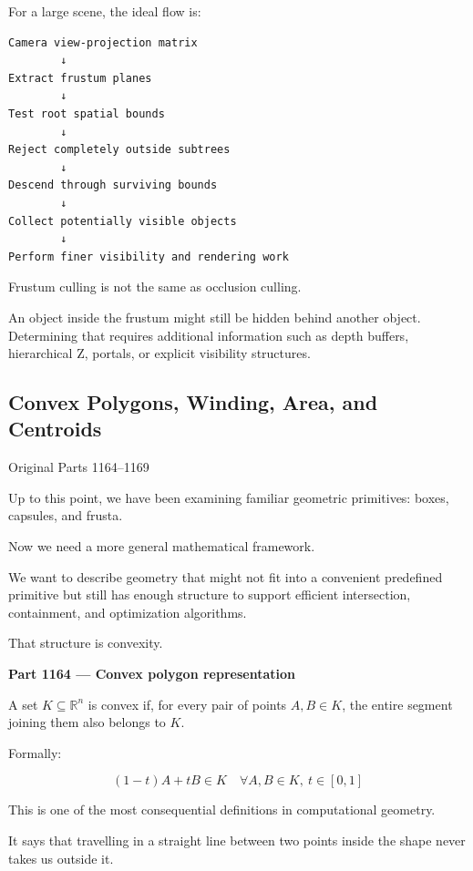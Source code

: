For a large scene, the ideal flow is:

\begin{verbatim}
Camera view-projection matrix
        ↓
Extract frustum planes
        ↓
Test root spatial bounds
        ↓
Reject completely outside subtrees
        ↓
Descend through surviving bounds
        ↓
Collect potentially visible objects
        ↓
Perform finer visibility and rendering work
\end{verbatim}

Frustum culling is not the same as occlusion culling.

An object inside the frustum might still be hidden behind another object. Determining that requires additional information such as depth buffers, hierarchical Z, portals, or explicit visibility structures.

\subsection{Convex Polygons, Winding, Area, and Centroids}\label{03-visual-computing-i-ch021-convex-polygons-winding-area-and-centroids}

\hypertarget{03-visual-computing-i-ch021-convex-polygons-winding-area-and-centroids}{}

Original Parts 1164--1169

Up to this point, we have been examining familiar geometric primitives: boxes, capsules, and frusta.

Now we need a more general mathematical framework.

We want to describe geometry that might not fit into a convenient predefined primitive but still has enough structure to support efficient intersection, containment, and optimization algorithms.

That structure is convexity.

\textbf{Part 1164 --- Convex polygon representation}

A set \(K\subseteq\mathbb R^n\) is convex if, for every pair of points \(A,B\in K\), the entire segment joining them also belongs to \(K\).

Formally:

\[
\boxed{ (1-t)A+tB\in K \quad \forall A,B\in K,\ t\in[0,1] }
\]

This is one of the most consequential definitions in computational geometry.

It says that travelling in a straight line between two points inside the shape never takes us outside it.

